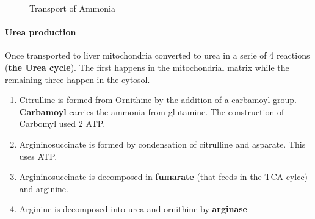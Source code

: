 \documentclass[../main.tex]{subfiles}
\begin{document}
\begin{figure}[H]
	\centering
	\hfil
	\caption{Transport of Ammonia}
\end{figure}

\paragraph{Urea production}
Once transported to liver mitochondria converted to urea in a serie of 4 reactions (\textbf{the Urea cycle}). The first happens in the mitochondrial matrix while the remaining three happen in the cytosol. 
\begin{enumerate}
	\item Citrulline is formed from Ornithine by the addition of a carbamoyl group. \textbf{Carbamoyl} carries the ammonia from glutamine. The construction of Carbomyl used 2 ATP.
	\item Argininosuccinate is formed by condensation of citrulline and asparate. This uses ATP.
	\item Argininosuccinate is decomposed in \textbf{fumarate} (that feeds in the TCA cylce) and arginine.
	\item Arginine is decomposed into urea and ornithine by \textbf{arginase}
\end{enumerate}
\end{document}
